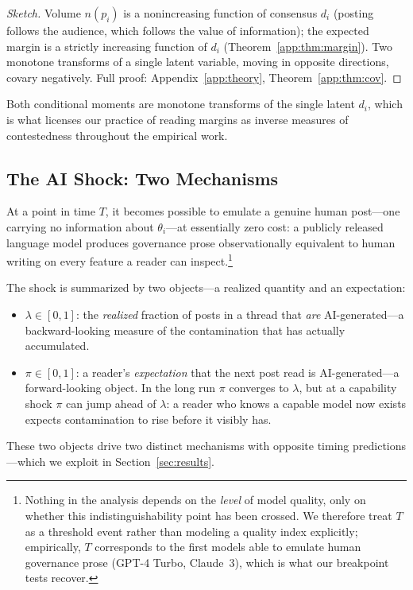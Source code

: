 \documentclass[12pt]{article}
\begin{document}
\begin{proof}[Sketch]
Volume $n(p_i)$ is a nonincreasing function of consensus $d_i$ (posting follows the audience, which follows the value of information); the expected margin is a strictly increasing function of $d_i$ (Theorem~\ref{app:thm:margin}). Two monotone transforms of a single latent variable, moving in opposite directions, covary negatively. Full proof: Appendix~\ref{app:theory}, Theorem~\ref{app:thm:cov}.
\end{proof}

Both conditional moments are monotone transforms of the single latent $d_i$, which is what licenses our practice of reading margins as inverse measures of contestedness throughout the empirical work.

\subsection{The AI Shock: Two Mechanisms}

At a point in time $T$, it becomes possible to emulate a genuine human post---one carrying no information about $\theta_i$---at essentially zero cost: a publicly released language model produces governance prose observationally equivalent to human writing on every feature a reader can inspect.\footnote{Nothing in the analysis depends on the \emph{level} of model quality, only on whether this indistinguishability point has been crossed. We therefore treat $T$ as a threshold event rather than modeling a quality index explicitly; empirically, $T$ corresponds to the first models able to emulate human governance prose (GPT-4 Turbo, Claude~3), which is what our breakpoint tests recover.}

The shock is summarized by two objects---a realized quantity and an expectation:
\begin{itemize}
\setlength{\itemsep}{2pt}\setlength{\parskip}{0pt}
\item $\lambda \in [0,1]$: the \emph{realized} fraction of posts in a thread that \emph{are} AI-generated---a backward-looking measure of the contamination that has actually accumulated.
\item $\pi \in [0,1]$: a reader's \emph{expectation} that the next post read is AI-generated---a forward-looking object. In the long run $\pi$ converges to $\lambda$, but at a capability shock $\pi$ can jump ahead of $\lambda$: a reader who knows a capable model now exists expects contamination to rise before it visibly has.
\end{itemize}
These two objects drive two distinct mechanisms with opposite timing predictions---which we exploit in Section~\ref{sec:results}.
\end{document}
